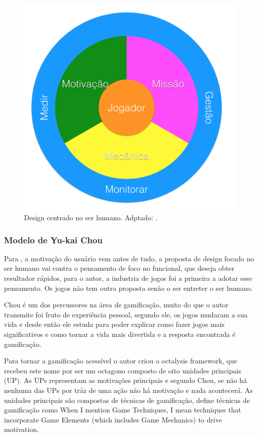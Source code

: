 \begin{figure}[h]
	\centering
		\includegraphics[keepaspectratio=true,scale=0.35]{figuras/pcd.png}
	\caption{Design centrado no ser humano. Adptado: \cite{kumar2013gamification}.\label{pcdfig}
}
\end{figure}

\subsubsection{Modelo de Yu-kai Chou}

Para \cite{chou2015actionable}, a motivação do usuário vem antes de tudo, a proposta de design focado no ser humano vai contra o pensamento de foco no funcional, que deseja obter resultador rápidos, para o autor, a industria de jogos foi a primeira a adotar esse pensamento. Os jogos não tem outra proposta senão o ser entreter o ser humano.

Chou é um dos percussores na área de gamificação, muito do que o autor transmite foi fruto de experiência pessoal, segundo ele, os jogos mudaram a sua vida e desde então ele estuda para poder explicar como fazer jogos mais significativos e como tornar a vida mais divertida e a resposta encontrada é gamificação. 

Para tornar a gamificação acessível o autor criou o octalysis framework, que recebeu este nome por ser um octagono composto de oito unidades principais (UP). As UPs representam as motivações principais e segundo Chou, se não há nenhuma das UPs por tráz de uma ação não há motivação e nada acontecerá. As unidades principais são compostas de técnicas de gamificação, \cite{chou2015actionable} define técnicas de gamificação como When I mention Game Techniques, I mean techniques that incorporate Game Elements (which includes Game Mechanics) to drive motivation.

